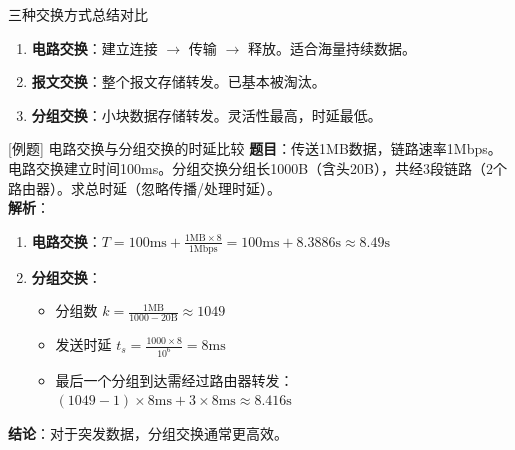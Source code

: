 \documentclass[10pt, aspectratio=169]{beamer}
\begin{document}
\begin{frame}{三种交换方式总结对比}
    \centering
    \vspace{0.5em}
    \begin{enumerate}
        \item \textbf{电路交换}：建立连接 $\rightarrow$ 传输 $\rightarrow$ 释放。适合海量持续数据。
        \item \textbf{报文交换}：整个报文存储转发。已基本被淘汰。
        \item \textbf{分组交换}：小块数据存储转发。灵活性最高，时延最低。
    \end{enumerate}
\end{frame}

\begin{frame}{[例题] 电路交换与分组交换的时延比较}
    \textbf{题目}：传送1MB数据，链路速率1Mbps。电路交换建立时间100ms。分组交换分组长1000B（含头20B），共经3段链路（2个路由器）。求总时延（忽略传播/处理时延）。\\
    \vspace{0.5em}
    \textbf{解析}：
    \begin{enumerate}
        \item \textbf{电路交换}：$T = 100\text{ms} + \frac{1\text{MB} \times 8}{1\text{Mbps}} = 100\text{ms} + 8.3886\text{s} \approx 8.49\text{s}$
        \item \textbf{分组交换}：
        \begin{itemize}
            \item 分组数 $k = \frac{1\text{MB}}{1000-20\text{B}} \approx 1049$
            \item 发送时延 $t_s = \frac{1000 \times 8}{10^6} = 8\text{ms}$
            \item 最后一个分组到达需经过路由器转发：$(1049-1) \times 8\text{ms} + 3 \times 8\text{ms} \approx 8.416\text{s}$
        \end{itemize}
    \end{enumerate}
    \textbf{结论}：对于突发数据，分组交换通常更高效。
\end{frame}
\end{document}

